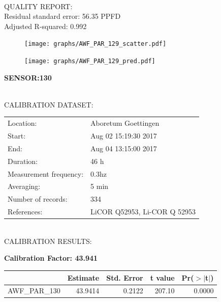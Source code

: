 \documentclass[oneside]{report}
\begin{document}
\hrulefill\\
QUALITY REPORT:\\
Residual standard error: 56.35 PPFD\\
Adjusted R-squared: 0.992



\begin{figure}[H]
  \centering
  \texttt{[image: graphs/AWF\_PAR\_129\_scatter.pdf]}
\end{figure}




\begin{figure}[H]
  \centering
  \texttt{[image: graphs/AWF\_PAR\_129\_pred.pdf]}
\end{figure}

\pagebreak


\begin{center}
\large{\textbf{SENSOR:130}}\\
\end{center}

\hrulefill\\
CALIBRATION DATASET:\\
\begin{table}[h!]
  \centering
  \label{tab:table1}
  \begin{tabular}{ll}
    Location: & Aboretum Goettingen\\ 
    
    
    Start:  & Aug 02 15:19:30 2017 \\
    End:   & Aug 04 13:15:00 2017\\ 
    Duration: & 46 h\\
    Measurement frequency: & 0.3hz\\
    Averaging:  &5 min\\
    Number of records: & 334 \\
    References: & LiCOR Q52953, Li-COR Q 52953 \\
  \end{tabular}
\end{table}

\hrulefill\\
CALIBRATION RESULTS:\\


\begin{center}
\textbf{\large{Calibration Factor: 43.941}}\\
\end{center}
\begin{table}[ht]
\centering
\begin{tabular}{rrrrr}
  \hline
 & Estimate & Std. Error & t value & Pr($>$$|$t$|$) \\ 
  \hline
AWF\_PAR\_130 & 43.9414 & 0.2122 & 207.10 & 0.0000 \\ 
   \hline
\end{tabular}
\end{table}
\end{document}
